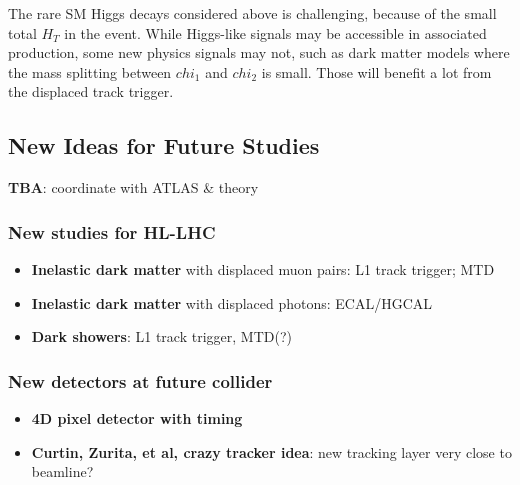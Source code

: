 The rare SM Higgs decays considered above is challenging, because of the small total $H_T$ in the event. 
While Higgs-like signals may be accessible in associated production, some new physics signals may not, such as dark matter models where the mass splitting between $chi_1$ and $chi_2$ is small. 
Those will benefit a lot from the displaced track trigger.

\subsection{New Ideas for Future Studies} \label{sec:upgradeideas}

\textbf{TBA}: coordinate with ATLAS \& theory

\subsubsection{New studies for HL-LHC} 

\begin{itemize}
\item \textbf{Inelastic dark matter} with displaced muon pairs: L1 track trigger; MTD
\item \textbf{Inelastic dark matter} with displaced photons: ECAL/HGCAL
\item \textbf{Dark showers}: L1 track trigger, MTD(?)
\end{itemize}

\subsubsection{New detectors at future collider}

\begin{itemize}
\item \textbf{4D pixel detector with timing} 
\item \textbf{Curtin, Zurita, et al, crazy tracker idea}: new tracking layer very close to beamline?
\end{itemize}
